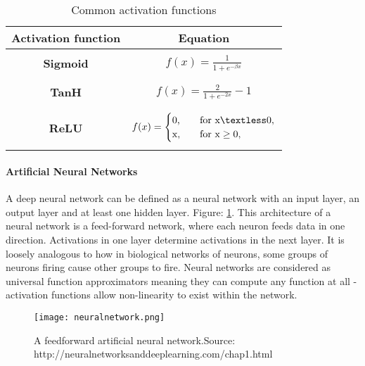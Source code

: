 \documentclass[11pt]{article}
\begin{document}
\newline\newline
\begin{table}[]
    \centering
    \begin{tabular}{ c|c }
        \hline
        \bf Activation function & 
        \bf Equation \\ \hline
        \\
        \bf Sigmoid & ${f(x) = \frac{1}{1+e^{-\beta x}}}$\\
        \\
        \hline
        \\
        \bf TanH & ${f(x) = \frac{2}{1+e^{-2x}}-1}$\\
        \\
        \hline
        \\
        \bf ReLU & 
        $   
        f(x) = 
             \begin{cases}
              \text{0,} &\quad\text{for x} \textless 0,\\
                \text{x,} &\quad\text{for x}  \ge0,\\
         
             \end{cases}
             
        $\\
        \\
        
        \hline
    \end{tabular}
    \caption{Common activation functions}
    \label{tab:activation_functions}
\end{table}

\paragraph{Artificial Neural Networks}
A deep neural network can be defined as a neural network with an input layer, an output layer and at least one hidden layer. Figure: \ref{fig:neuralnetwork}. This architecture of a neural network is a feed-forward network, where each neuron feeds data in one direction. Activations in one layer determine activations in the next layer. It is loosely analogous to how in biological networks of neurons, some groups of neurons firing cause other groups to fire. Neural networks are considered as universal function approximators meaning they can compute any function at all - activation functions allow non-linearity to exist within the network. \textcolor{cite}{\citet{wangann}} 
\newline\newline
\newline\newline
\begin{figure}[h!]
\centering
\texttt{[image: neuralnetwork.png]}
\caption{A feedforward artificial neural network.\newline Source: http://neuralnetworksanddeeplearning.com/chap1.html }
\label{fig:neuralnetwork}
\end{figure}
\newline
\end{document}

